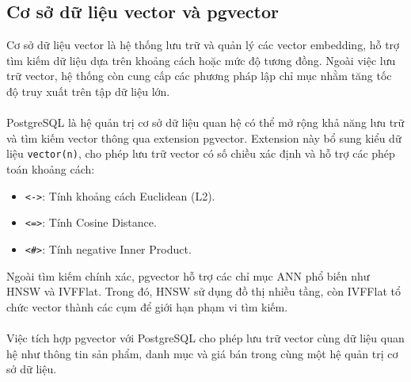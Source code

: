 \documentclass{report}
\begin{document}
\subsection{Cơ sở dữ liệu vector và pgvector}
Cơ sở dữ liệu vector là hệ thống lưu trữ và quản lý các vector embedding, hỗ trợ tìm kiếm dữ liệu dựa trên khoảng cách hoặc mức độ tương đồng. Ngoài việc lưu trữ vector, hệ thống còn cung cấp các phương pháp lập chỉ mục nhằm tăng tốc độ truy xuất trên tập dữ liệu lớn.\\\\
PostgreSQL là hệ quản trị cơ sở dữ liệu quan hệ có thể mở rộng khả năng lưu trữ và tìm kiếm vector thông qua extension pgvector. Extension này bổ sung kiểu dữ liệu \texttt{vector(n)}, cho phép lưu trữ vector có số chiều xác định và hỗ trợ các phép toán khoảng cách:
\begin{itemize}
    \item \texttt{<->}: Tính khoảng cách Euclidean (L2).
    \item \texttt{<=>}: Tính Cosine Distance.
    \item \texttt{<\#>}: Tính negative Inner Product.
\end{itemize}
Ngoài tìm kiếm chính xác, pgvector hỗ trợ các chỉ mục ANN phổ biến như HNSW và IVFFlat. Trong đó, HNSW sử dụng đồ thị nhiều tầng, còn IVFFlat tổ chức vector thành các cụm để giới hạn phạm vi tìm kiếm.\\\\
Việc tích hợp pgvector với PostgreSQL cho phép lưu trữ vector cùng dữ liệu quan hệ như thông tin sản phẩm, danh mục và giá bán trong cùng một hệ quản trị cơ sở dữ liệu.
\end{document}
